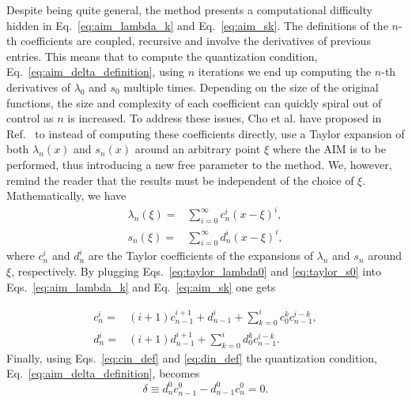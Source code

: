 Despite being quite general, the method presents a computational difficulty hidden in Eq.~\eqref{eq:aim_lambda_k} and Eq.~\eqref{eq:aim_sk}. The definitions of the $n$-th coefficients are coupled, recursive and involve the derivatives of previous entries. This means that to compute the quantization condition, Eq.~\eqref{eq:aim_delta_definition}, using $n$ iterations we end up computing the $n$-th derivatives of $\lambda_0$ and $s_0$ multiple times. Depending on the size of the original functions, the size and complexity of each coefficient can quickly spiral out of control as $n$ is increased. To address these issues, Cho et al. have proposed in Ref.~\cite{aim_improved} to instead of computing these coefficients directly, use a Taylor expansion of both $\lambda_n(x)$ and $s_n(x)$ around an arbitrary point $\xi$ where the \ac{AIM} is to be performed, thus introducing a new free parameter to the method. We, however, remind the reader that the results must be independent of the choice of $\xi$. Mathematically, we have
%
\begin{align}
  \lambda_n(\xi) = & \sum_{i=0}^{\infty}c^{i}_n(x - \xi)^i, \label{eq:taylor_lambda0} \\
  s_n(\xi) =       & \sum_{i=0}^{\infty}d^{i}_n(x - \xi)^i, \label{eq:taylor_s0}
\end{align}
%
where $c^i_n$ and $d^i_n$ are the Taylor coefficients of the expansions of $\lambda_n$ and $s_n$ around $\xi$, respectively. By plugging Eqs.~\eqref{eq:taylor_lambda0} and \eqref{eq:taylor_s0} into Eqs.~\eqref{eq:aim_lambda_k} and Eq.~\eqref{eq:aim_sk} one gets

\begin{align}
  c^i_n = & (i+1)c^{i+1}_{n-1} + d^i_{n-1} + \sum_{k=0}^{i}c^k_0c^{i-k}_{n-1}, \label{eq:cin_def} \\
  d^i_n = & (i+1)d^{i+1}_{n-1} + \sum_{k=0}^{i}d^k_0c^{i-k}_{n-1}. \label{eq:din_def}
\end{align}
%
Finally, using Eqs.~\eqref{eq:cin_def} and \eqref{eq:din_def} the quantization condition, Eq.~\eqref{eq:aim_delta_definition}, becomes
%
\begin{equation}
  \delta \equiv d^0_n c^0_{n-1} - d^0_{n-1}c^0_n = 0.
  \label{eq:improved_delta}
\end{equation}

